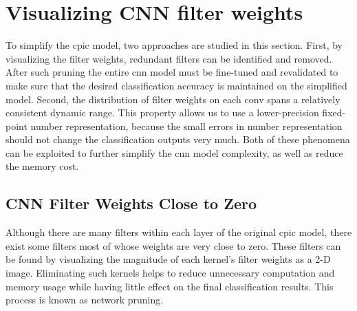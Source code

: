 \documentclass{article}
\begin{document}
\section{Visualizing CNN filter weights}
\label{sec:visualization}
%
To simplify the \gls{cpic} model, two approaches are studied in this section.
First, by visualizing the filter weights, redundant filters can be identified and removed. After such pruning the entire \gls{cnn} model must be fine-tuned and revalidated to make sure that the desired classification accuracy is maintained on the simplified model.
Second, the distribution of filter weights on each \gls{conv} spans a relatively consistent dynamic range.
This property allows us to use a lower-precision fixed-point number representation,
because the small errors in number representation should not change the classification outputs very much.
Both of these phenomena can be exploited to further simplify the \gls{cnn} model complexity, as well as reduce the memory cost.

\subsection{CNN Filter Weights Close to Zero}
\label{sec:zero_weights}
%
Although there are many filters within each layer of the original \gls{cpic} model, there exist some filters most of whose weights are very close to zero.
These filters can be found by visualizing the magnitude of each kernel's filter weights as a 2-D image.
Eliminating such kernels helps to reduce unnecessary computation and memory usage while having little effect on the final classification results.
This process is known as network pruning.
\end{document}
